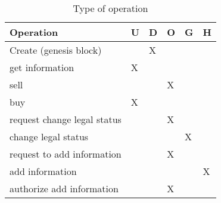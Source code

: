 \begin{table}[htb]
\footnotesize
    \begin{center}
    \caption{Type of operation}
    \label{table:operations}
        \begin{tabular}{|l|l|l|l|l|l|}
        \hline
        \textbf{Operation}          &\textbf{U}& \textbf{D}&\textbf{O}& \textbf{G}& \textbf{H}\\ \hline
        Create (genesis block)      &          & X         &          &           &           \\ \hline
        get information             & X        &           &          &           &           \\ \hline\hline
        sell                        &          &           & X        &           &           \\ \hline
        buy                         & X        &           &          &           &           \\ \hline\hline
        request change legal status &          &           & X        &           &           \\ \hline
        change legal status         &          &           &          & X         &           \\ \hline\hline
        request to add information  &          &           & X        &           &           \\ \hline
        add information             &          &           &          &           & X         \\ \hline
        authorize add information   &          &           & X        &           &           \\ \hline
        \end{tabular}
    \end{center}
\end{table}